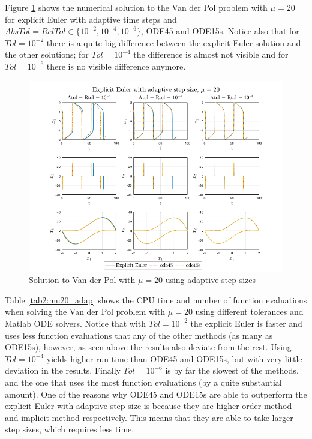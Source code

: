 Figure \ref{fig2:adap_mu20} shows the numerical solution to the Van der Pol problem with $\mu = 20$ for explicit Euler with adaptive time steps and $AbsTol=RelTol \in \{10^{-2}, 10^{-4}, 10^{-6}\}$, ODE45 and ODE15s. Notice also that for $Tol = 10^{-2}$ there is a quite big difference between the explicit Euler solution and the other solutions; for $Tol = 10^{-4}$ the difference is almost not visible and for $Tol = 10^{-6}$ there is no visible difference anymore.

\begin{figure}[H]
    \centering
    \includegraphics[width=\textwidth]{graphics/opg2/mu20_adap.png}
    \caption{Solution to Van der Pol with $\mu = 20$ using adaptive step sizes}
    \label{fig2:adap_mu20}
\end{figure}

Table \ref{tab2:mu20_adap} shows the CPU time and number of function evaluations when solving the Van der Pol problem with $\mu = 20$ using different tolerances and Matlab ODE solvers. Notice that with $Tol = 10^{-2}$ the explicit Euler is faster and uses less function evaluations that any of the other methods (as many as ODE15s), however, as seen above the results also deviate from the rest. Using $Tol = 10^{-4}$ yields higher run time than ODE45 and ODE15s, but with very little deviation in the results. Finally $Tol = 10^{-6}$ is by far the slowest of the methods, and the one that uses the most function evaluations (by a quite substantial amount). One of the reasons why ODE45 and ODE15s are able to outperform the explicit Euler with adaptive step size is because they are higher order method and implicit method respectively. This means that they are able to take larger step sizes, which requires less time.

